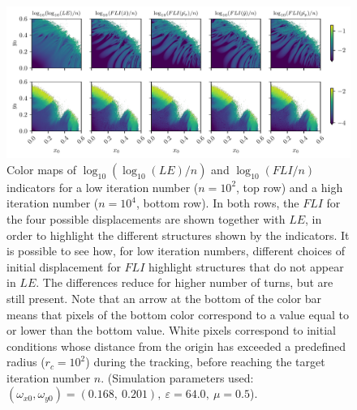 \begin{figure}[th]
    \centering
    \includegraphics[width=\textwidth]{6_dynamic_indicators/fig/corrected_figs/LE_FLI_NEO.pdf}
    \caption{Color maps of $\log_{10}(\log_{10}(LE)/n)$ and $\log_{10}(FLI/n)$ indicators for a low iteration number ($n=10^2$, top row) and a high iteration number ($n=10^4$, bottom row). In both rows, the $FLI$ for the four possible displacements are shown together with $LE$, in order to highlight the different structures shown by the indicators. It is possible to see how, for low iteration numbers, different choices of initial displacement for $FLI$ highlight structures that do not appear in $LE$. The differences reduce for higher number of turns, but are still present. Note that an arrow at the bottom of the color bar means that pixels of the bottom color correspond to a value equal to or lower than the bottom value. White pixels correspond to initial conditions whose distance from the origin has exceeded a predefined radius ($r_c=10^2$) during the tracking, before reaching the target iteration number $n$. (Simulation parameters used: $(\omega_{x0},\omega_{y0})= (0.168,\ 0.201),\ \varepsilon=64.0,\ \mu=0.5$).}
    \label{fig:le_fli_compare_short_long}
\end{figure}


